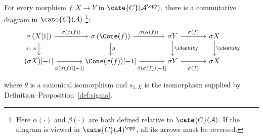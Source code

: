 \begin{proposition}\label{prop:sigma-triangulated}
	For every morphism $f:X\to Y$ in $\cate{C}(\mathcal{A}^{\opp})$, there
	is a commutative diagram in $\cate{C}(\mathcal{A})$%
	\footnote{Here $\alpha(\cdot)$ and $\beta(\cdot)$ are both defined
	relative to $\cate{C}(\mathcal{A})$. If the diagram is viewed in
	$\cate{C}(\mathcal{A})^{\opp}$, all its arrows must be reversed.}:
	\[\begin{tikzcd}[column sep=large]
		\sigma\left( X{[1]} \right) \arrow[r, "{\sigma(\beta(f))}"] \arrow[d, "{s_{1,X}}"'] & \sigma\left(\Cone(f)\right) \arrow[r, "{\sigma(\alpha(f))}"] \arrow[d, "\theta"] & \sigma Y \arrow[r, "\sigma(f)"] \arrow[d, "\identity"] & \sigma X \arrow[d, "{\identity}"] \\
		(\sigma X){[-1]} \arrow[r, "{\alpha(\sigma(f))[-1]}"' inner sep=0.6em] & \Cone(\sigma(f)){[-1]} \arrow[r, "{\beta(\sigma(f))[-1]}"' inner sep=0.6em] & \sigma Y \arrow[r, "{\sigma(f)}"' inner sep=0.6em] & \sigma X
	\end{tikzcd}\]
	where $\theta$ is a canonical isomorphism and $s_{1,X}$ is the
	isomorphism supplied by Definition--Proposition~\ref{def:sigma}.
\end{proposition}
